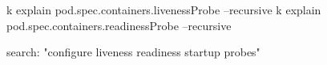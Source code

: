 \begin{tcbitemize}[
  raster columns=1, raster equal height=rows,
  blanker, cheat subtitle
]
    \begin{cheatcodebash}
    k explain pod.spec.containers.livenessProbe --recursive
    k explain pod.spec.containers.readinessProbe --recursive
    \end{cheatcodebash}
    \begin{cheatcodebash}
    search: "configure liveness readiness startup probes"
    \end{cheatcodebash}

\end{tcbitemize}
